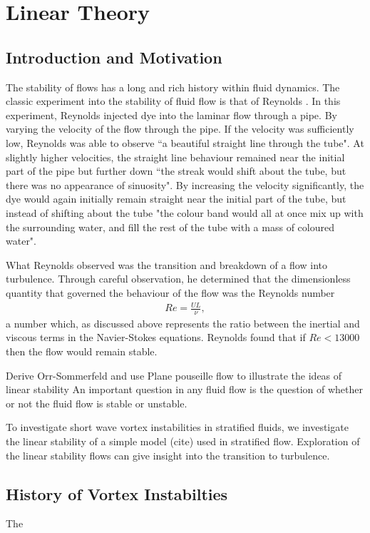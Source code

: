 \chapter{Linear Theory}

\section{Introduction and Motivation}
The stability of flows has a long and rich history within fluid dynamics. The classic experiment into the stability of fluid flow is that of  Reynolds \cite{reynolds1883}. In this experiment, Reynolds injected dye into the laminar flow through a pipe. By varying the velocity of the flow through the pipe. If the velocity was sufficiently low, Reynolds was able to observe ``a beautiful straight line through the tube". At slightly higher velocities, the straight line behaviour remained near the initial part of the pipe but further down ``the streak would shift about the tube, but there was no appearance of sinuosity". By increasing the velocity significantly, the dye would again initially remain straight near the initial part of the tube, but instead of shifting about the tube "the colour band would all at once mix up with the surrounding water, and fill the rest of the tube with a mass of coloured water". 

What Reynolds observed was the transition and breakdown of a flow into turbulence. Through careful observation, he determined that the dimensionless quantity that governed the behaviour of the flow was the Reynolds number 
\begin{align}
Re =\frac{UL}{\nu},
\end{align}
a number which, as discussed above represents the ratio between the inertial and viscous terms in the Navier-Stokes equations. Reynolds found that if $Re<13000$ then the flow would remain stable. 

Derive Orr-Sommerfeld and use Plane pouseille flow to illustrate the ideas of linear stability 
An important question in any fluid flow is the question of whether or not the fluid flow is stable or unstable. 


To investigate short wave vortex instabilities in stratified fluids, we investigate the linear stability of a simple model (cite) used in stratified flow. Exploration of the linear stability flows can give insight into the transition to turbulence. 

\section{History of Vortex Instabilties}
The 
